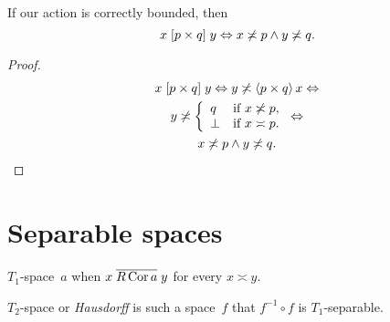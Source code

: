 % 
% 

\begin{thm}
If our action is correctly bounded, then
\[ x\mathrel{\left[p\times q\right]}y\Leftrightarrow x\not\asymp p\land y\not\asymp q. \]
\end{thm}

\begin{proof}
\begin{multline*}
x\mathrel{\left[p\times q\right]}y \Leftrightarrow
y\not\asymp\left\langle p\times q\right\rangle x \Leftrightarrow \\
y\not\asymp
\left\{\begin{array}{ll}q&\text{if }x\not\asymp p,\\\bot&\text{if }x\asymp p.\end{array}\right. \Leftrightarrow \\
x\not\asymp p\land y\not\asymp q.
\end{multline*}
\end{proof}

% 

\chapter{Separable spaces}

$T_1$-space~$a$ when $x\mathrel{\overline{R\operatorname{Cor} a}}y$ for every $x\asymp y$.

$T_2$-space or \emph{Hausdorff} is such a space~$f$ that $f^{-1}\circ f$ is $T_1$-separable.


